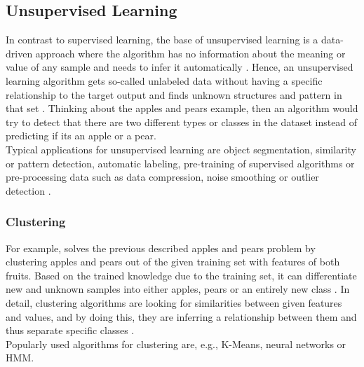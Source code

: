 \documentclass[MGS,Master,english]{twbook}%
\begin{document}
\subsection{Unsupervised Learning}
In contrast to supervised learning, the base of unsupervised learning is a data-driven approach where the algorithm has no information about the meaning or value of any sample and needs to infer it automatically \cite{ml::book::developer}. Hence, an unsupervised learning algorithm gets so-called unlabeled data without having a specific relationship to the target output and finds unknown structures and pattern in that set \cite{ai::book}. Thinking about the apples and pears example, then an algorithm would try to detect that there are two different types or classes in the dataset instead of predicting if its an apple or a pear.\\
Typical applications for unsupervised learning are object segmentation, similarity or pattern detection, automatic labeling, pre-training of supervised algorithms or pre-processing data such as data compression, noise smoothing or outlier detection \cite{ml::book::algorithms} \cite{ai::book}.

\subsubsection{Clustering}
For example, solves the previous described apples and pears problem by clustering apples and pears out of the given training set with features of both fruits. Based on the trained knowledge due to the training set, it can differentiate new and unknown samples into either apples, pears or an entirely new class \cite{ai::book}. In detail, clustering algorithms are looking for similarities between given features and values, and by doing this, they are inferring a relationship between them and thus separate specific classes \cite{ml::book::developer}.\\
Popularly used algorithms for clustering are, e.g., K-Means, neural networks or \ac{HMM}. \cite{ml::book::developer}
\end{document}
